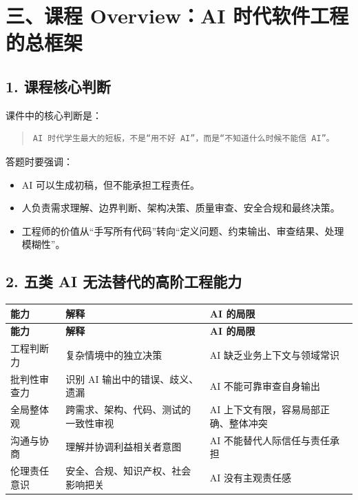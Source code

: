 \documentclass[UTF8,zihao=-4]{ctexart}
\begin{document}
\section{三、课程 Overview：AI 时代软件工程的总框架}

\subsection{1. 课程核心判断}

课件中的核心判断是：

\begin{quote}
\footnotesize
\begin{verbatim}
AI 时代学生最大的短板，不是“用不好 AI”，而是“不知道什么时候不能信 AI”。
\end{verbatim}
\end{quote}

答题时要强调：

\begin{itemize}
\item AI 可以生成初稿，但不能承担工程责任。
\item 人负责需求理解、边界判断、架构决策、质量审查、安全合规和最终决策。
\item 工程师的价值从“手写所有代码”转向“定义问题、约束输出、审查结果、处理模糊性”。
\end{itemize}

\subsection{2. 五类 AI 无法替代的高阶工程能力}

{
\footnotesize
\begin{longtable}{|>{\raggedright\arraybackslash}p{}|>{\raggedright\arraybackslash}p{}|>{\raggedright\arraybackslash}p{}|}
\hline
\textbf{能力} & \textbf{解释} & \textbf{AI 的局限} \\
\hline
\endfirsthead
\hline
\textbf{能力} & \textbf{解释} & \textbf{AI 的局限} \\
\hline
\endhead
工程判断力 & 复杂情境中的独立决策 & AI 缺乏业务上下文与领域常识 \\
\hline
批判性审查力 & 识别 AI 输出中的错误、歧义、遗漏 & AI 不能可靠审查自身输出 \\
\hline
全局整体观 & 跨需求、架构、代码、测试的一致性审视 & AI 上下文有限，容易局部正确、整体冲突 \\
\hline
沟通与协商 & 理解并协调利益相关者意图 & AI 不能替代人际信任与责任承担 \\
\hline
伦理责任意识 & 安全、合规、知识产权、社会影响把关 & AI 没有主观责任感 \\
\hline
\end{longtable}
}
\end{document}
